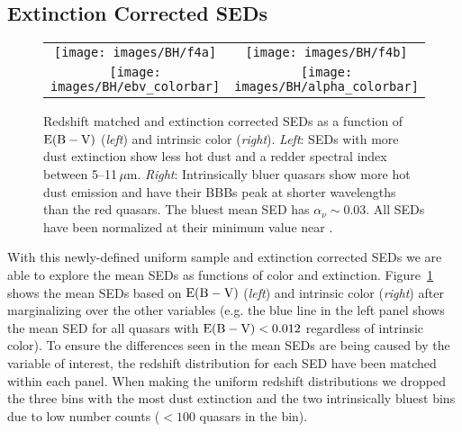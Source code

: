 \subsection{Extinction Corrected SEDs} \label{l_bc_dust}
\begin{figure}[t]
\begin{center}
\begin{tabular}{cc}
	\texttt{[image: images/BH/f4a]} & \texttt{[image: images/BH/f4b]} \\
	\hspace{.5cm} \texttt{[image: images/BH/ebv\_colorbar]} & \hspace{.5cm} \texttt{[image: images/BH/alpha\_colorbar]}
\end{tabular}
\caption[Mean corrected SEDs grouped by dust and color]{\label{sed_dust_color_rc} Redshift matched and extinction corrected SEDs as a function of ${\rm E(B-V)}$ ({\em left}) and intrinsic color ({\em right}).  {\em Left}: SEDs with more dust extinction show less hot dust and a redder spectral index between 5--11\,$\mu$m. {\em Right}: Intrinsically bluer quasars show more hot dust emission and have their BBBs peak at shorter wavelengths than the red quasars.  The bluest mean SED has $\alpha_\nu \sim 0.03$.  All SEDs have been normalized at their minimum value near \onemum.}
\end{center}
\end{figure}

With this newly-defined uniform sample and extinction corrected SEDs we are able to explore the mean SEDs as functions of color and extinction.  Figure~\ref{sed_dust_color_rc}  shows the mean SEDs based on ${\rm E(B-V)}$ ({\em left}) and intrinsic color ({\em right}) after marginalizing over the other variables (e.g. the blue line in the left panel shows the mean SED for all quasars with ${\rm E(B-V)}<0.012$ regardless of intrinsic color).  To ensure the differences seen in the mean SEDs are being caused by the variable of interest, the redshift distribution for each SED have been matched within each panel.  When making the uniform redshift distributions we dropped the three bins with the most dust extinction and the two intrinsically bluest bins due to low number counts ($< 100$ quasars in the bin).

